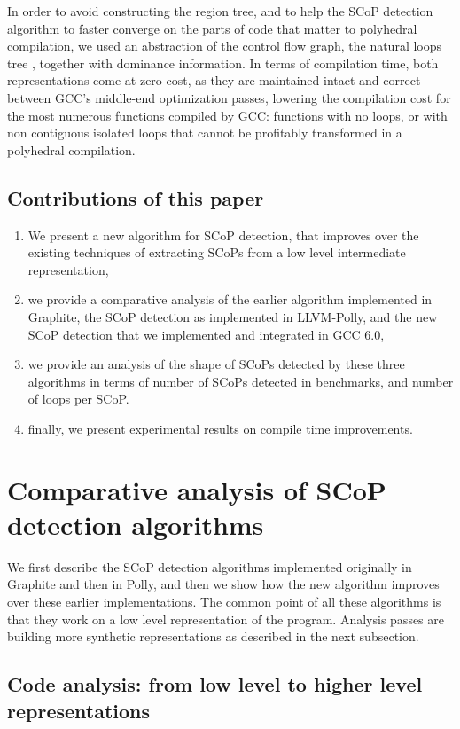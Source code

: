 \documentclass{sigplanconf}
\begin{document}
In order to avoid constructing the region tree, and to help the SCoP detection
algorithm to faster converge on the parts of code that matter to polyhedral
compilation, we used an abstraction of the control flow graph, the natural loops
tree \cite{dragonbook}, together with dominance information.  In terms of
compilation time, both representations come at zero cost, as they are maintained
intact and correct between GCC's middle-end optimization passes, lowering the
compilation cost for the most numerous functions compiled by GCC: functions with
no loops, or with non contiguous isolated loops that cannot be profitably
transformed in a polyhedral compilation.

\subsection{Contributions of this paper}
\begin{enumerate}
  \item We present a new algorithm for SCoP detection, that improves over the
    existing techniques of extracting SCoPs from a low level intermediate
    representation,
  \item we provide a comparative analysis of the earlier algorithm implemented
    in Graphite, the SCoP detection as implemented in LLVM-Polly, and the new
    SCoP detection that we implemented and integrated in GCC 6.0,
  \item we provide an analysis of the shape of SCoPs detected by these three
    algorithms in terms of number of SCoPs detected in benchmarks, and number of
    loops per SCoP.
  \item finally, we present experimental results on compile time improvements.
\end{enumerate}

\newpage
\section{Comparative analysis of SCoP detection algorithms}

We first describe the SCoP detection algorithms implemented originally in
Graphite and then in Polly, and then we show how the new algorithm improves over
these earlier implementations.  The common point of all these algorithms is that
they work on a low level representation of the program.  Analysis passes are
building more synthetic representations as described in the next subsection.

\subsection{Code analysis: from low level to higher level representations}
\end{document}
